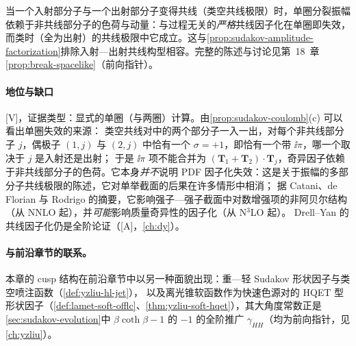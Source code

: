 \begin{remark}\label{rem:sudakov-spacelike}
当一个入射部分子与一个出射部分子变得共线（类空共线极限）时，单圈分裂振幅依赖于非共线部分子的色荷与动量：与过程无关的\emph{严格}共线因子化在单圈即失效，
而类时（全为出射）的共线极限中它成立\cite{CataniDeFlorianRodrigo2012}。这与\cref{prop:sudakov-amplitude-factorization}排除入射—出射共线构型相容。完整的陈述与讨论见第~18~章\cref{prop:break-spacelike}（前向指针）。
\end{remark}

\paragraph{地位与缺口}[V]，证据类型：显式的单圈（与两圈）计算\cite{CataniDeFlorianRodrigo2012}。由\cref{prop:sudakov-coulomb}(c) 可以看出单圈失效的来源：
类空共线对中的两个部分子一入一出，对每个非共线部分子 $j$，偶极子 $(1,j)$ 与 $(2,j)$ 中恰有一个 $\sigma=+1$，即恰有一个带 $\ii\pi$，哪一个取决于 $j$ 是入射还是出射；
于是 $\ii\pi$ 项不能合并为 $(\mathbf T_1+\mathbf T_2)\cdot\mathbf T_j$，奇异因子依赖于非共线部分子的色荷。它本身\emph{并不}说明 PDF 因子化失效：这是关于振幅的多部分子共线极限的陈述，它对单举截面的后果在许多情形中相消；
据 Catani、de Florian 与 Rodrigo 的摘要，它影响强子—强子截面中对数增强项的非阿贝尔结构（从 NNLO 起），并\emph{可能}影响质量奇异性的因子化（从 N$^3$LO 起）。
Drell--Yan 的共线因子化仍是全阶论证（[A]，\cref{ch:dy}）。

\paragraph{与前沿章节的联系。}本章的 cusp 结构在前沿章节中以另一种面貌出现：重—轻 Sudakov 形状因子与类空喷注函数（\cref{def:yzliu-hl-jet}），
以及离光锥软函数作为快速色源对的 HQET 型形状因子（\cref{def:lamet-soft-offlc}、\cref{thm:yzliu-soft-hqet}），其大角度常数正是\cref{sec:sudakov-evolution}中 $\beta\coth\beta-1$ 的 $-1$ 的全阶推广 $\gamma_{HH}$（均为前向指针，见\cref{ch:yzliu}）。

